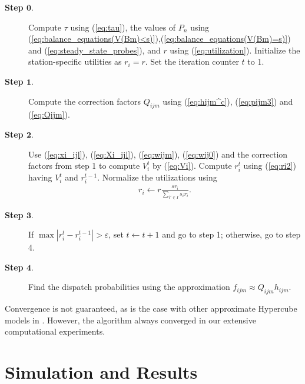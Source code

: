 \documentclass[11pt]{article}\topmargin 0mm
\begin{document}
\begin{description}
  \item[\textbf{Step $\mathbf{0.}$}] Compute $\tau$ using
      (\ref{eq:tau}), the values of $P_n$ using
      (\ref{eq:balance_equations(V(Bm)<s)}),(\ref{eq:balance_equations(V(Bm)=s)})
      and (\ref{eq:steady_state_probes}), and $r$ using
      (\ref{eq:utilization}). Initialize the
      station-specific utilities as $r_i=r$. Set the
      iteration counter $t$ to 1.
  \item[\textbf{Step $\mathbf{1.}$}] Compute the correction
      factors $Q_{ijm}$ using (\ref{eq:hijm^c}),
      (\ref{eq:pijm3}) and (\ref{eq:Qijm}).
  \item[\textbf{Step $\mathbf{2.}$}] Use (\ref{eq:xi_ijl}),
      (\ref{eq:Xi_ijl}), (\ref{eq:wijm}), (\ref{eq:wij0})
      and the correction factors from step 1 to compute
      $V_i^t$ by (\ref{eq:Vi}). Compute $r_i^t$ using
      (\ref{eq:ri2}) having $V_i^t$ and $r_i^{t-1}$.
      Normalize the utilizations using
        \begin{equation}
        \label{eq:normalization}
        \begin{split}
        r_i \leftarrow r\frac{s r_i}{\sum_{i'\in I} s_i r_i}.
        \end{split}
        \end{equation}
  \item[\textbf{Step $\mathbf{3.}$}] If $\max
      |r_i^t-r_i^{t-1}| > \varepsilon$, set $t\leftarrow
      t+1$ and go to step 1; otherwise, go to step 4.
  \item[\textbf{Step $\mathbf{4.}$}] Find the dispatch
      probabilities using the approximation $f_{ijm}
      \approx Q_{ijm} h_{ijm}$.
\end{description}


Convergence is not guaranteed, as is the case with other
approximate Hypercube models in \citet{Budge-etal-09,Jarvis85}.
However, the algorithm always converged in our extensive
computational experiments.



\section{Simulation and Results}
\label{sec:simulation_and_results}
\end{document}
